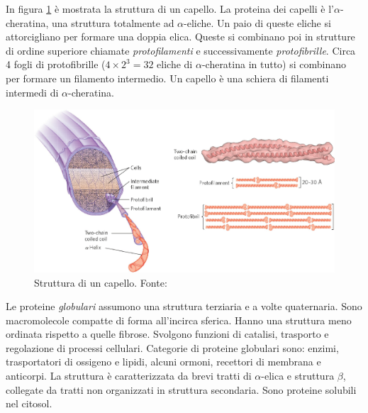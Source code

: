 {{\par In figura \ref{fig:capello} è mostrata la struttura di un capello. La proteina dei capelli è l'$\alpha$-cheratina, una struttura totalmente ad $\alpha$-eliche. Un paio di queste eliche si attorcigliano per formare una doppia elica. Queste si combinano poi in strutture di ordine superiore chiamate \textit{protofilamenti} e successivamente \textit{protofibrille}. Circa 4 fogli di protofibrille ($4\times2^{3}=32$ eliche di $\alpha$-cheratina in tutto) si combinano per formare un filamento intermedio. Un capello è una schiera di filamenti intermedi di $\alpha$-cheratina.

\begin{figure}[h]
	\centering
	\includegraphics[scale=0.6]{images/capello-full.png}
	\caption{Struttura di un capello. Fonte: \cite{nelson2017lehninger}}
	\label{fig:capello}
\end{figure}

Le proteine \textit{globulari} assumono una struttura terziaria e a volte quaternaria. Sono macromolecole compatte di forma all'incirca sferica. Hanno una struttura meno ordinata rispetto a quelle fibrose. Svolgono funzioni di catalisi, trasporto e regolazione di processi cellulari. Categorie di proteine globulari sono: enzimi, trasportatori di ossigeno e lipidi, alcuni ormoni, recettori di membrana e anticorpi. La struttura è caratterizzata da brevi tratti di $\alpha$-elica e struttura $\beta$, collegate da tratti non organizzati in struttura secondaria. Sono proteine solubili nel citosol. 

}
}


